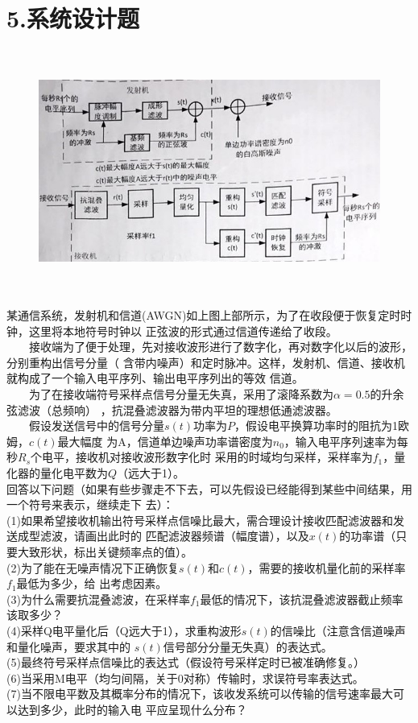 \documentclass[UTF8]{ctexart}
\begin{document}
\section*{5.系统设计题\\}
\begin{figure}[H]
  \centering
  \includegraphics[width=15cm,height=8cm]{5.jpg}
\end{figure}
某通信系统，发射机和信道(AWGN)如上图上部所示，为了在收段便于恢复定时时钟，这里将本地符号时钟以
正弦波的形式通过信道传递给了收段。\\
$\quad\quad$接收端为了便于处理，先对接收波形进行了数字化，再对数字化以后的波形，分别重构出信号分量（
含带内噪声）和定时脉冲。这样，发射机、信道、接收机就构成了一个输入电平序列、输出电平序列出的等效
信道。\\
$\quad\quad$为了在接收端符号采样点信号分量无失真，采用了滚降系数为$\alpha=0.5$的升余弦滤波（总频响）
，抗混叠滤波器为带内平坦的理想低通滤波器。\\
$\quad\quad$假设发送信号中的信号分量$s(t)$功率为$P$，假设电平换算功率时的阻抗为1欧姆，$c(t)$最大幅度
为A，信道单边噪声功率谱密度为$n_0$，输入电平序列速率为每秒$R_s$个电平，接收机对接收波形数字化时
采用的时域均匀采样，采样率为$f_1$，量化器的量化电平数为$Q$（远大于1）。\\
回答以下问题（如果有些步骤走不下去，可以先假设已经能得到某些中间结果，用一个符号来表示，继续走下
去）：\\
(1)如果希望接收机输出符号采样点信噪比最大，需合理设计接收匹配滤波器和发送成型滤波，请画出此时的
匹配滤波器频谱（幅度谱），以及$x(t)$的功率谱（只要大致形状，标出关键频率点的值）。\\
(2)为了能在无噪声情况下正确恢复$s(t)$和$c(t)$，需要的接收机量化前的采样率$f_1$最低为多少，给
出考虑因素。\\
(3)为什么需要抗混叠滤波，在采样率$f_1$最低的情况下，该抗混叠滤波器截止频率该取多少？\\
(4)采样Q电平量化后（Q远大于1），求重构波形$s(t)$的信噪比（注意含信道噪声和量化噪声，要求其中的
$s(t)$信号部分分量无失真）的表达式。\\
(5)最终符号采样点信噪比的表达式（假设符号采样定时已被准确修复。）\\
(6)当采用M电平（均匀间隔，关于0对称）传输时，求误符号率表达式。\\
(7)当不限电平数及其概率分布的情况下，该收发系统可以传输的信号速率最大可以达到多少，此时的输入电
平应呈现什么分布？\\
\end{document}
